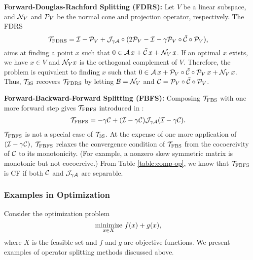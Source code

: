 {\textbf{Forward-Douglas-Rachford Splitting (FDRS):} Let $V$ be  a linear subspace, and ${\mathcal{N}}_V$ and ${\mathcal{P}}_V$ be the normal cone and projection operator, respectively. The FDRS~\cite{briceno2015FDRS}
 $${{\mathcal{T}}_{\mathrm{FDRS}}}={\mathcal{I}}-{\mathcal{P}}_V+{\mathcal{J}}_{\gamma{\mathcal{A}}}\circ(2{\mathcal{P}}_V-{\mathcal{I}}-\gamma {\mathcal{P}}_V\circ\tilde{{\mathcal{C}}}\circ{\mathcal{P}}_V),$$
aims at finding a point $x$ such that $0\in{\mathcal{A}}\,x+\tilde{{\mathcal{C}}}\,x+{\mathcal{N}}_V\,x$. If an optimal $x$ exists, we have $x\in V$ and ${\mathcal{N}}_Vx$ is the orthogonal complement of $V$. Therefore, the problem is equivalent to finding $x$ such that $0\in{\mathcal{A}}\,x+{\mathcal{P}}_V\circ\tilde{{\mathcal{C}}}\circ{\mathcal{P}}_V\,x+{\mathcal{N}}_V\,x$. Thus, ${{\mathcal{T}}_{\mathrm{3S}}}$ recovers ${{\mathcal{T}}_{\mathrm{FDRS}}}$ by letting ${\mathcal{B}}={\mathcal{N}}_V$ and ${\mathcal{C}}={\mathcal{P}}_V\circ\tilde{{\mathcal{C}}}\circ{\mathcal{P}}_V$.

\textbf{Forward-Backward-Forward Splitting (FBFS):} Composing ${{\mathcal{T}}_{\mathrm{FBS}}}$ with one more forward step gives ${{\mathcal{T}}_{\mathrm{FBFS}}}$ introduced in \cite{FBF_Tseng}:
\begin{align}\label{eqn:fbf}
\TFBFS = -\gamma \cC  + (\cI-\gamma \cC)\cJ_{\gamma \cA}(\cI-\gamma \cC).
\end{align} %
${{\mathcal{T}}_{\mathrm{FBFS}}}$ is not  a special case of ${{\mathcal{T}}_{\mathrm{3S}}}$. At the expense of one more application of $({\mathcal{I}}-\gamma {\mathcal{C}})$, ${{\mathcal{T}}_{\mathrm{FBFS}}}$ relaxes the convergence condition  of ${{\mathcal{T}}_{\mathrm{FBS}}}$ from  the cocoercivity of ${\mathcal{C}}$ {to its monotonicity. (For example, a nonzero skew symmetric matrix is monotonic but not cocoercive.)}
From Table \ref{table:comp-op}, we know that ${{\mathcal{T}}_{\mathrm{FBFS}}}$ is CF if both ${\mathcal{C}}$ and ${\mathcal{J}}_{\gamma {\mathcal{A}}}$ are separable.

\subsubsection{Examples in Optimization}
Consider the optimization problem
\begin{equation}\label{eq:opt-example}
\Min_{x\in X}\, f(x)+g(x),
\end{equation}
where $X$ is the feasible set and $f$ and $g$ are objective functions. We present examples of operator splitting methods discussed above.


}
